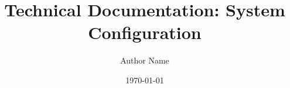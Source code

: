 
\documentclass{article}

\usepackage{amsmath} %
\usepackage{listings} %

\title{Technical Documentation: System Configuration}
\author{Author Name}
\date{\today}



\maketitle

\section{Introduction}

This technical documentation provides information on the configuration of a system. The system is comprised of multiple components, each of which must be properly configured in order to ensure optimal performance. This documentation will outline the steps necessary to properly configure each component of the system.

\section{System Components}

The system is comprised of the following components:

\begin{itemize}
    \item Component 1
    \item Component 2
    \item Component 3
\end{itemize}

\section{Component 1 Configuration}

Component 1 must be properly configured in order to ensure the system functions correctly. To configure Component 1, follow these steps:

\begin{enumerate}
    \item Step 1
    \item Step 2
    \item Step 3
\end{enumerate}

